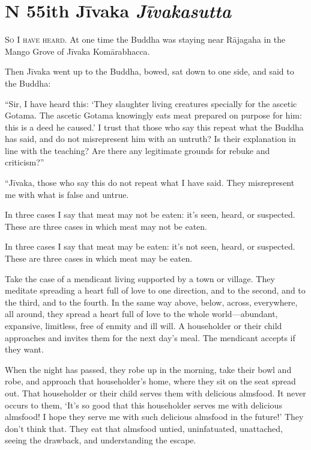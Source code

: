 \documentclass[12pt,openany]{book}%
\newcommand*{\suttatitleacronym}[1]{\smaller[2]{#1}\vspace*{.3em}}
\newcommand*{\suttatitletranslation}[1]{\linebreak{#1}}
\newcommand*{\suttatitleroot}[1]{\linebreak\smaller[2]\itshape{#1}}
\newcommand*{\tocacronym}[1]{\hspace*{-3.3em}{#1}\quad}
\newcommand*{\toctranslation}[1]{#1}
\newcommand*{\tocroot}[1]{(\textit{#1})}
\newcommand*{\scevam}[1]{\textsc{#1}}
\begin{document}
%
\section*{{\suttatitleacronym MN 55}{\suttatitletranslation With Jīvaka }{\suttatitleroot Jīvakasutta}}
\addcontentsline{toc}{section}{\tocacronym{MN 55} \toctranslation{With Jīvaka } \tocroot{Jīvakasutta}}

\scevam{So I have heard. }At one time the Buddha was staying near \textsanskrit{Rājagaha} in the Mango Grove of \textsanskrit{Jīvaka} \textsanskrit{Komārabhacca}. 

Then \textsanskrit{Jīvaka} went up to the Buddha, bowed, sat down to one side, and said to the Buddha: 

“Sir, I have heard this: ‘They slaughter living creatures specially for the ascetic Gotama. The ascetic Gotama knowingly eats meat prepared on purpose for him: this is a deed he caused.’ I trust that those who say this repeat what the Buddha has said, and do not misrepresent him with an untruth? Is their explanation in line with the teaching? Are there any legitimate grounds for rebuke and criticism?” 

“\textsanskrit{Jīvaka}, those who say this do not repeat what I have said. They misrepresent me with what is false and untrue. 

In three cases I say that meat may not be eaten: it’s seen, heard, or suspected. These are three cases in which meat may not be eaten. 

In three cases I say that meat may be eaten: it’s not seen, heard, or suspected. These are three cases in which meat may be eaten. 

Take the case of a mendicant living supported by a town or village. They meditate spreading a heart full of love to one direction, and to the second, and to the third, and to the fourth. In the same way above, below, across, everywhere, all around, they spread a heart full of love to the whole world—abundant, expansive, limitless, free of enmity and ill will. A householder or their child approaches and invites them for the next day’s meal. The mendicant accepts if they want. 

When the night has passed, they robe up in the morning, take their bowl and robe, and approach that householder’s home, where they sit on the seat spread out. That householder or their child serves them with delicious almsfood. It never occurs to them, ‘It’s so good that this householder serves me with delicious almsfood! I hope they serve me with such delicious almsfood in the future!’ They don’t think that. They eat that almsfood untied, uninfatuated, unattached, seeing the drawback, and understanding the escape. 
\end{document}
